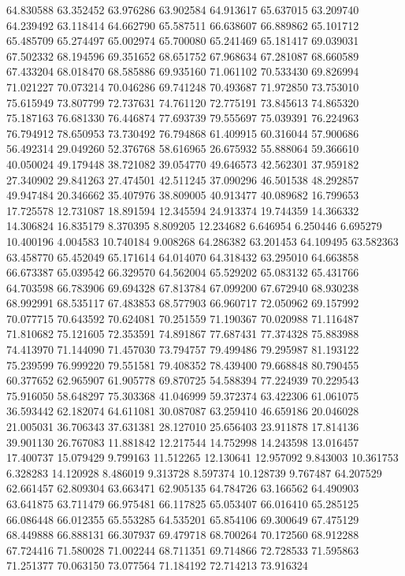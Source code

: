 64.830588
63.352452
63.976286
63.902584
64.913617
65.637015
63.209740
64.239492
63.118414
64.662790
65.587511
66.638607
66.889862
65.101712
65.485709
65.274497
65.002974
65.700080
65.241469
65.181417
69.039031
67.502332
68.194596
69.351652
68.651752
67.968634
67.281087
68.660589
67.433204
68.018470
68.585886
69.935160
71.061102
70.533430
69.826994
71.021227
70.073214
70.046286
69.741248
70.493687
71.972850
73.753010
75.615949
73.807799
72.737631
74.761120
72.775191
73.845613
74.865320
75.187163
76.681330
76.446874
77.693739
79.555697
75.039391
76.224963
76.794912
78.650953
73.730492
76.794868
61.409915
60.316044
57.900686
56.492314
29.049260
52.376768
58.616965
26.675932
55.888064
59.366610
40.050024
49.179448
38.721082
39.054770
49.646573
42.562301
37.959182
27.340902
29.841263
27.474501
42.511245
37.090296
46.501538
48.292857
49.947484
20.346662
35.407976
38.809005
40.913477
40.089682
16.799653
17.725578
12.731087
18.891594
12.345594
24.913374
19.744359
14.366332
14.306824
16.835179
8.370395
8.809205
12.234682
6.646954
6.250446
6.695279
10.400196
4.004583
10.740184
9.008268
64.286382
63.201453
64.109495
63.582363
63.458770
65.452049
65.171614
64.014070
64.318432
63.295010
64.663858
66.673387
65.039542
66.329570
64.562004
65.529202
65.083132
65.431766
64.703598
66.783906
69.694328
67.813784
67.099200
67.672940
68.930238
68.992991
68.535117
67.483853
68.577903
66.960717
72.050962
69.157992
70.077715
70.643592
70.624081
70.251559
71.190367
70.020988
71.116487
71.810682
75.121605
72.353591
74.891867
77.687431
77.374328
75.883988
74.413970
71.144090
71.457030
73.794757
79.499486
79.295987
81.193122
75.239599
76.999220
79.551581
79.408352
78.439400
79.668848
80.790455
60.377652
62.965907
61.905778
69.870725
54.588394
77.224939
70.229543
75.916050
58.648297
75.303368
41.046999
59.372374
63.422306
61.061075
36.593442
62.182074
64.611081
30.087087
63.259410
46.659186
20.046028
21.005031
36.706343
37.631381
28.127010
25.656403
23.911878
17.814136
39.901130
26.767083
11.881842
12.217544
14.752998
14.243598
13.016457
17.400737
15.079429
9.799163
11.512265
12.130641
12.957092
9.843003
10.361753
6.328283
14.120928
8.486019
9.313728
8.597374
10.128739
9.767487
64.207529
62.661457
62.809304
63.663471
62.905135
64.784726
63.166562
64.490903
63.641875
63.711479
66.975481
66.117825
65.053407
66.016410
65.285125
66.086448
66.012355
65.553285
64.535201
65.854106
69.300649
67.475129
68.449888
66.888131
66.307937
69.479718
68.700264
70.172560
68.912288
67.724416
71.580028
71.002244
68.711351
69.714866
72.728533
71.595863
71.251377
70.063150
73.077564
71.184192
72.714213
73.916324
